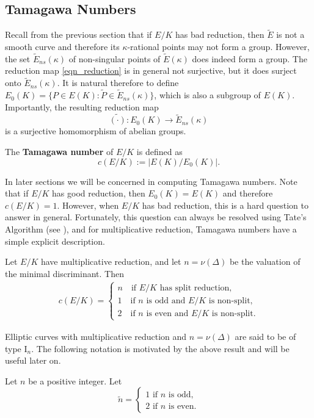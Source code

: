 
\subsection{Tamagawa Numbers} \label{subs_tamagawa}

Recall from the previous section that if $E/K$ has bad reduction, then $\tilde{E}$ is not a smooth curve and therefore its $\kappa$-rational points may not form a group. However, the set $\tilde{E}_{ns}(\kappa)$ of non-singular points of $\tilde{E}(\kappa)$ does indeed form a group. The reduction map \eqref{eqn_reduction} is in general not surjective, but it does surject onto $\tilde{E}_{ns}(\kappa)$. It is natural therefore to define $E_0(K)=\{P\in E(K):\widetilde{P}\in\tilde{E}_{ns}(\kappa)\}$, which is also a subgroup of $E(K)$. Importantly, the resulting reduction map 
$$\widetilde{(\cdot)}:E_0(K)\longrightarrow \tilde{E}_{ns}(\kappa)$$
is a surjective homomorphism of abelian groups.
\begin{defn}
    The \textbf{Tamagawa number} of $E/K$ is defined as
    \begin{equation}
        c(E/K):=|E(K)/E_0(K)|.
    \end{equation}
\end{defn}
In later sections we will be concerned in computing Tamagawa numbers. Note that if $E/K$ has good reduction, then $E_0(K)=E(K)$ and therefore $c(E/K)=1$. However, when $E/K$ has bad reduction, this is a hard question to answer in general. Fortunately, this question can always be resolved using Tate's Algorithm (see \cite[\S IV.9]{S2}), and for multiplicative reduction, Tamagawa numbers have a simple explicit description.

\begin{lemma}\label{lem_mult_tam}
    Let $E/K$ have multiplicative reduction, and let $n=\nu(\Delta)$ be the valuation of the minimal discriminant. Then
    \begin{align*}
        c(E/K)=
        \begin{cases}
            n \quad\text{if $E/K$ has split reduction,}\\
            1 \quad\text{if $n$ is odd and $E/K$ is non-split,}\\
            2 \quad\text{if $n$ is even and $E/K$ is non-split}.
        \end{cases}    
    \end{align*}
\end{lemma}

Elliptic curves with multiplicative reduction and $n=\nu(\Delta)$ are said to be of type $\mathrm{I}_n$. The following notation is motivated by the above result and will be useful later on.
\begin{notation}\label{not_n}
    Let $n$ be a positive integer. Let 
    \[
        \tilde{n}=
        \begin{cases}
            1 \text{ if } n \text{ is odd,}\\
            2 \text{ if } n \text{ is even.}
        \end{cases}
    \]
    
\end{notation}

